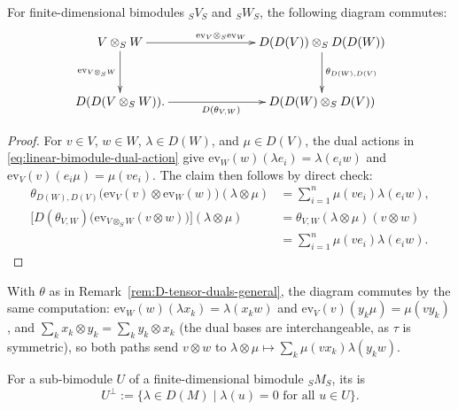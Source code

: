 \begin{lemma}\label{lem:evaluation-tensor-compatibility}
For finite-dimensional bimodules ${}_SV_S$ and ${}_SW_S$, the following diagram commutes:
\begin{equation}\label{eq:bidual-tensor-square}
\vcenter{\xymatrix@C=70pt@R=32pt{
V\otimes_S W
\ar[r]^{\mathrm{ev}_V\otimes_S\mathrm{ev}_W}
\ar[d]_{\mathrm{ev}_{V\otimes_S W}}
& D(D(V))\otimes_S D(D(W))
\ar[d]^{\theta_{D(W),D(V)}}\\
D(D(V\otimes_S W))
\ar[r]_{D(\theta_{V,W})}.
& D(D(W)\otimes_S D(V))
}}
\end{equation}
\end{lemma}

\begin{supplementary}
\begin{proof}
For $v\in V$, $w\in W$, $\lambda\in D(W)$, and $\mu\in D(V)$, the dual actions in \eqref{eq:linear-bimodule-dual-action} give
$\mathrm{ev}_W(w)(\lambda e_i)=\lambda(e_iw)$ and $\mathrm{ev}_V(v)(e_i\mu)=\mu(ve_i)$.
The claim then follows by direct check:
\[
\begin{aligned}
\theta_{D(W),D(V)}\bigl(\mathrm{ev}_V(v)\otimes\mathrm{ev}_W(w)\bigr)(\lambda\otimes\mu)
&=\sum_{i=1}^n\mu(ve_i)\lambda(e_iw),\\
\bigl[D(\theta_{V,W})\bigl(\mathrm{ev}_{V\otimes_S W}(v\otimes w)\bigr)\bigr](\lambda\otimes\mu)
&=\theta_{V,W}(\lambda\otimes\mu)(v\otimes w)\\
&=\sum_{i=1}^n\mu(ve_i)\lambda(e_iw).
\end{aligned}
\]
\end{proof}
\end{supplementary}

\begin{advanced}
\begin{remark}[General $S$]
With $\theta$ as in Remark~\ref{rem:D-tensor-duals-general}, the diagram commutes by the same computation: $\mathrm{ev}_W(w)(\lambda x_k)=\lambda(x_kw)$ and $\mathrm{ev}_V(v)(y_k\mu)=\mu(vy_k)$, and $\sum_kx_k\otimes y_k=\sum_ky_k\otimes x_k$ (the dual bases are interchangeable, as $\tau$ is symmetric), so both paths send $v\otimes w$ to $\lambda\otimes\mu\mapsto\sum_k\mu(vx_k)\lambda(y_kw)$.
\end{remark}
\end{advanced}

\begin{definition}\label{def:D-orthogonal}
For a sub-bimodule $U$ of a finite-dimensional bimodule ${}_SM_S$, its  is
\[
U^\perp:=\{\lambda\in D(M)\mid\lambda(u)=0\text{ for all }u\in U\}.
\]
\end{definition}


